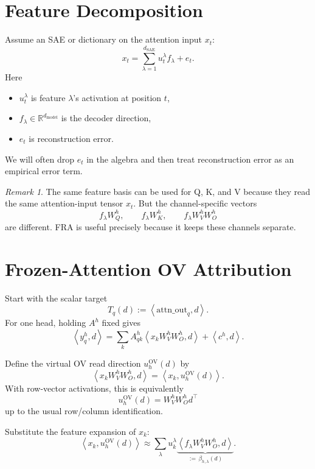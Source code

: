 \documentclass[11pt]{article}
\newcommand{\R}{\mathbb{R}}
\newcommand{\ip}[2]{\left\langle #1, #2 \right\rangle}
\newcommand{\dm}{d_{\mathrm{model}}}
\newcommand{\dsae}{d_{\mathrm{SAE}}}
\newcommand{\OV}{\mathrm{OV}}
\newcommand{\attnout}{\mathrm{attn\_out}}
\theoremstyle{definition}
\theoremstyle{plain}
\theoremstyle{remark}
\newtheorem{remark}{Remark}
\begin{document}
\section{Feature Decomposition}

Assume an SAE or dictionary on the attention input \(x_t\):
\[
  x_t
  =
  \sum_{\lambda=1}^{\dsae} u_t^\lambda f_\lambda
  +
  e_t.
\]
Here
\begin{itemize}[leftmargin=*]
  \item \(u_t^\lambda\) is feature \(\lambda\)'s activation at position \(t\),
  \item \(f_\lambda \in \R^{\dm}\) is the decoder direction,
  \item \(e_t\) is reconstruction error.
\end{itemize}

We will often drop \(e_t\) in the algebra and then treat reconstruction error
as an empirical error term.

\begin{remark}
The same feature basis can be used for Q, K, and V because they read the same
attention-input tensor \(x_t\).  But the channel-specific vectors
\[
  f_\lambda W_Q^h,\qquad f_\lambda W_K^h,\qquad f_\lambda W_V^h W_O^h
\]
are different.  FRA is useful precisely because it keeps these channels
separate.
\end{remark}

\section{Frozen-Attention OV Attribution}

Start with the scalar target
\[
  T_q(d) := \ip{\attnout_q}{d}.
\]
For one head, holding \(A^h\) fixed gives
\[
  \ip{y_q^h}{d}
  =
  \sum_k A_{qk}^h \ip{x_k W_V^h W_O^h}{d}
  +
  \ip{c^h}{d}.
\]

Define the virtual OV read direction \(u_h^{\OV}(d)\) by
\[
  \ip{x_k W_V^h W_O^h}{d}
  =
  \ip{x_k}{u_h^{\OV}(d)}.
\]
With row-vector activations, this is equivalently
\[
  u_h^{\OV}(d)
  =
  W_V^h W_O^h d^\top
\]
up to the usual row/column identification.

Substitute the feature expansion of \(x_k\):
\[
  \ip{x_k}{u_h^{\OV}(d)}
  \approx
  \sum_\lambda u_k^\lambda
  \underbrace{\ip{f_\lambda W_V^h W_O^h}{d}}_{:=\,\beta_{h,\lambda}(d)}.
\]
\end{document}
